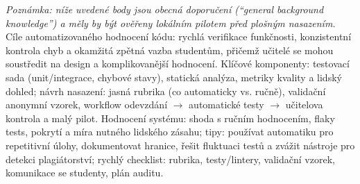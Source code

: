 \noindent\textit{Poznámka: níže uvedené body jsou obecná doporučení (``general background knowledge'') a měly by být ověřeny lokálním pilotem před plošným nasazením.}\medskip
Cíle automatizovaného hodnocení kódu: rychlá verifikace funkčnosti, konzistentní kontrola chyb a okamžitá zpětná vazba studentům, přičemž učitelé se mohou soustředit na design a komplikovanější hodnocení.
Klíčové komponenty: testovací sada (unit/integrace, chybové stavy), statická analýza, metriky kvality a lidský dohled; návrh nasazení: jasná rubrika (co automaticky vs. ručně), validační anonymní vzorek, workflow odevzdání \(\to\) automatické testy \(\to\) učitelova kontrola a malý pilot.
Hodnocení systému: shoda s ručním hodnocením, flaky tests, pokrytí a míra nutného lidského zásahu; tipy: používat automatiku pro repetitivní úlohy, dokumentovat hranice, řešit fluktuaci testů a zvážit nástroje pro detekci plagiátorství; rychlý checklist: rubrika, testy/lintery, validační vzorek, komunikace se studenty, plán auditu.